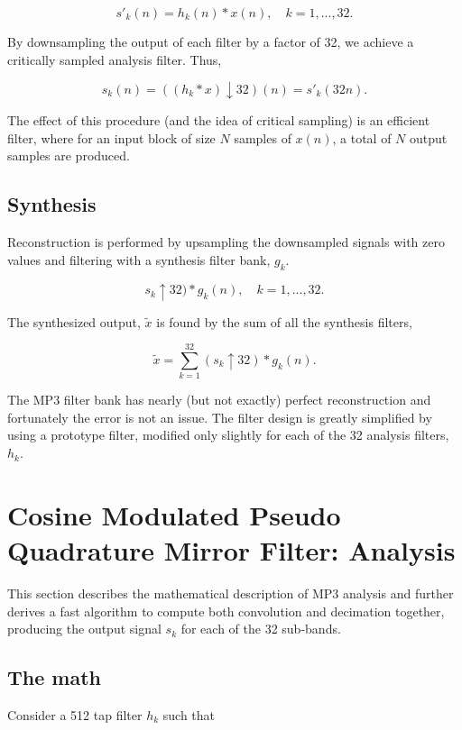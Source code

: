 \documentclass[11pt,a4paper]{article}
\begin{document}
\begin{equation}
s'_k(n) = h_k(n) * x(n), \quad k = 1, ..., 32.
\end{equation}

By downsampling the output of each filter by a factor of 32, we achieve a critically sampled analysis filter. Thus,

\begin{equation}
s_k(n) = ((h_k * x) \downarrow 32)(n) = s'_k(32n).
\end{equation}

The effect of this procedure (and the idea of critical sampling) is an efficient filter, where for an input block of size $N$ samples of $x(n)$, a total of $N$ output samples are produced.

\subsection{Synthesis}
Reconstruction is performed by upsampling the downsampled signals with zero values and filtering with a synthesis filter bank, $g_k$.

\begin{equation}
s_k \uparrow 32) * g_k(n), \quad k = 1, ..., 32.
\end{equation}

The synthesized output, $\tilde{x}$ is found by the sum of all the synthesis filters,

\begin{equation}
\tilde{x} = \sum_{k=1}^{32} (s_k \uparrow 32) * g_k(n).
\end{equation}

The MP3 filter bank has nearly (but not exactly) perfect reconstruction and fortunately the error is not an issue. The filter design is greatly simplified by using a prototype filter, modified only slightly for each of the 32 analysis filters, $h_k$.

\pagebreak

\section{Cosine Modulated Pseudo Quadrature Mirror Filter: Analysis}
This section describes the mathematical description of MP3 analysis and further derives a fast algorithm to compute both convolution and decimation together, producing the output signal $s_k$ for each of the 32 sub-bands.

\subsection{The math}
Consider a 512 tap filter $h_k$ such that
\end{document}
